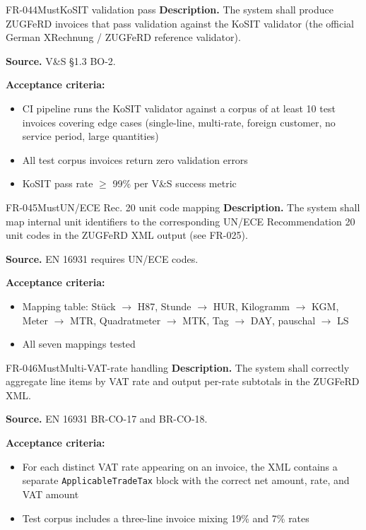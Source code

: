 \documentclass[11pt,a4paper]{article}
\begin{document}
\begin{requirement}{FR-044}{Must}{KoSIT validation pass}
\textbf{Description.} The system shall produce ZUGFeRD invoices that pass validation against the KoSIT validator (the official German XRechnung / ZUGFeRD reference validator).

\textbf{Source.} V\&S \S1.3 BO-2.

\textbf{Acceptance criteria:}
\begin{itemize}
    \item CI pipeline runs the KoSIT validator against a corpus of at least 10 test invoices covering edge cases (single-line, multi-rate, foreign customer, no service period, large quantities)
    \item All test corpus invoices return zero validation errors
    \item KoSIT pass rate $\geq$ 99\% per V\&S success metric
\end{itemize}
\end{requirement}

\begin{requirement}{FR-045}{Must}{UN/ECE Rec. 20 unit code mapping}
\textbf{Description.} The system shall map internal unit identifiers to the corresponding UN/ECE Recommendation 20 unit codes in the ZUGFeRD XML output (see FR-025).

\textbf{Source.} EN 16931 requires UN/ECE codes.

\textbf{Acceptance criteria:}
\begin{itemize}
    \item Mapping table: St\"uck $\rightarrow$ H87, Stunde $\rightarrow$ HUR, Kilogramm $\rightarrow$ KGM, Meter $\rightarrow$ MTR, Quadratmeter $\rightarrow$ MTK, Tag $\rightarrow$ DAY, pauschal $\rightarrow$ LS
    \item All seven mappings tested
\end{itemize}
\end{requirement}

\begin{requirement}{FR-046}{Must}{Multi-VAT-rate handling}
\textbf{Description.} The system shall correctly aggregate line items by VAT rate and output per-rate subtotals in the ZUGFeRD XML.

\textbf{Source.} EN 16931 BR-CO-17 and BR-CO-18.

\textbf{Acceptance criteria:}
\begin{itemize}
    \item For each distinct VAT rate appearing on an invoice, the XML contains a separate \texttt{ApplicableTradeTax} block with the correct net amount, rate, and VAT amount
    \item Test corpus includes a three-line invoice mixing 19\% and 7\% rates
\end{itemize}
\end{requirement}
\end{document}
